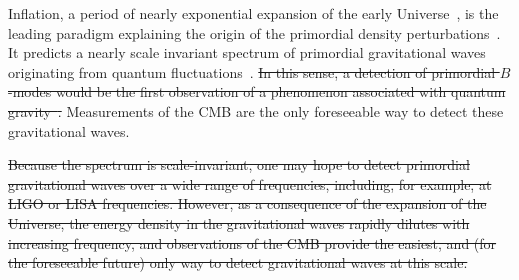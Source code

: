 \documentclass[PICOReport.tex]{subfiles}
\begin{document}

Inflation, a period of nearly exponential expansion of the early Universe~\cite{Guth:1980zm,Linde:1981mu,Albrecht:1982wi,Starobinsky:1980te}, is the leading paradigm explaining the origin of the primordial density perturbations~\cite{Mukhanov:1981xt,Guth:1982ec,Hawking:1982cz,Starobinsky:1982ee,Bardeen:1983qw}. It predicts a nearly scale invariant spectrum of primordial gravitational waves originating from quantum fluctuations~\cite{Starobinsky:1979ty}. \sout{In this sense, a detection of primordial $B$-modes would be the first observation of a phenomenon associated with quantum gravity~\cite{Krauss:2013pha}.}  Measurements of the \ac{CMB} are the only foreseeable way to detect these gravitational waves.

\sout{Because the spectrum is scale-invariant, one may hope to detect primordial gravitational waves over a wide range of frequencies, including, for example, at LIGO or LISA frequencies. However, as a consequence of the expansion of the Universe, the energy density in the gravitational waves rapidly dilutes with increasing frequency, and observations of the CMB provide the easiest, and (for the foreseeable future) only way to detect gravitational waves at this scale. }
\end{document}
